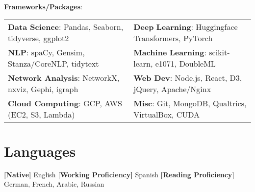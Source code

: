 \documentclass[letterpaper,11pt]{article}
\newcommand{\skfill}{\hfill}
\newcommand{\rpkg}[1]{#1}
\begin{document}
\begin{minipage}{\textwidth}
\textbf{Frameworks/Packages}:\vspace{1mm}
\setlength{}
\noindent\begin{tabularx}{\textwidth}{@{}bb@{}}
	\textbf{Data Science}: \skfill Pandas, \skfill Seaborn, \skfill \rpkg{tidyverse}, \skfill \rpkg{ggplot2} & \textbf{Deep} \textbf{Learning}: \skfill Huggingface Transformers, \skfill PyTorch\vspace{0.5mm}\\
	\textbf{NLP}: \skfill spaCy, \skfill Gensim, \skfill Stanza/CoreNLP, \skfill \rpkg{tidytext} & \textbf{Machine} \textbf{Learning}: \skfill scikit-learn, \skfill \rpkg{e1071}, \skfill DoubleML\vspace{0.5mm}\\
	\textbf{Network Analysis}: \skfill NetworkX, \skfill nxviz, \skfill Gephi, \skfill \rpkg{igraph} & \textbf{Web Dev}: \skfill Node.js, \skfill React, \skfill D3, \skfill jQuery, \skfill Apache/Nginx\vspace{0.5mm}\\
	\textbf{Cloud Computing}: GCP, \skfill AWS (EC2, S3, Lambda) & \textbf{Misc}: \skfill Git, \skfill MongoDB, \skfill Qualtrics, \skfill VirtualBox, \hfill CUDA \\
\end{tabularx}


\section{Languages}

\textbf{[Native]} English \textbf{[Working Proficiency]} Spanish \textbf{[Reading Proficiency]} German, French, Arabic, Russian

%
%
%
%
%


\end{minipage}
\end{document}
